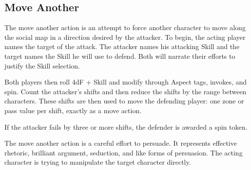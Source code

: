 \subsection{Move Another}\label{sec:Move Another}

The move another action is an attempt to force another character to move along the social map in a direction desired by the attacker. To begin, the acting player names the target of the attack. The attacker names his attacking Skill and the target names the Skill he will use to defend. Both will narrate their efforts to justify the Skill selection.

Both players then roll 4dF + Skill and modify through Aspect tags, invokes, and spin. Count the attacker's shifts and then reduce the shifts by the range between characters. These shifts are then used to move the defending player: one zone or pass value per shift, exactly as a move action.

If the attacker fails by three or more shifts, the defender is awarded a spin token.

The move another action is a careful effort to persuade. It represents effective rhetoric, brilliant argument, seduction, and like forms of persuasion. The acting character is trying to manipulate the target character directly.

